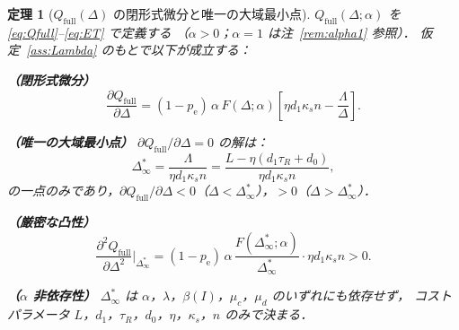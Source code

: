 \documentclass[12pt,a4paper]{article}
\theoremstyle{plain}
\newtheorem{theorem}{定理}[section]
\theoremstyle{definition}
\theoremstyle{remark}
\newcommand{\pe}{p_{\mathrm{e}}}
\newcommand{\Qf}{Q_{\mathrm{full}}}
\newcommand{\betaI}{\beta(I)}
\newcommand{\Dinf}{\Delta^{*}_{\infty}}
\newcommand{\La}{\Lambda}   %
\begin{document}
\begin{theorem}[$\Qf(\Delta)$ の閉形式微分と唯一の大域最小点]\label{thm:dQ}
$\Qf(\Delta;\alpha)$ を \eqref{eq:Qfull}--\eqref{eq:ET} で定義する
（$\alpha>0$；$\alpha=1$ は注~\ref{rem:alpha1} 参照）．
仮定~\ref{ass:Lambda} のもとで以下が成立する：

\noindent\textbf{（閉形式微分）}
\begin{equation}\label{eq:dQfull}
\frac{\partial\Qf}{\partial\Delta}
=(1-\pe)\,\alpha\,F(\Delta;\alpha)\left[\eta d_1\kappa_s n-\frac{\La}{\Delta}\right].
\end{equation}

\noindent\textbf{（唯一の大域最小点）}
$\partial\Qf/\partial\Delta=0$ の解は：
\begin{equation}\label{eq:Dinf}
\Dinf
=\frac{\La}{\eta d_1\kappa_s n}
=\frac{L-\eta(d_1\tau_R+d_0)}{\eta d_1\kappa_s n},
\end{equation}
の一点のみであり，$\partial\Qf/\partial\Delta<0$（$\Delta<\Dinf$），$>0$（$\Delta>\Dinf$）．

\noindent\textbf{（厳密な凸性）}
\begin{equation}\label{eq:d2Qfull}
\frac{\partial^2\Qf}{\partial\Delta^2}\bigg|_{\Dinf}
=(1-\pe)\,\alpha\,\frac{F(\Dinf;\alpha)}{\Dinf}\cdot\eta d_1\kappa_s n>0.
\end{equation}

\noindent\textbf{（$\alpha$ 非依存性）}
$\Dinf$ は $\alpha$，$\lambda$，$\betaI$，$\mu_c$，$\mu_d$ のいずれにも依存せず，
コストパラメータ $L$，$d_1$，$\tau_R$，$d_0$，$\eta$，$\kappa_s$，$n$ のみで決まる．
\end{theorem}
\end{document}
